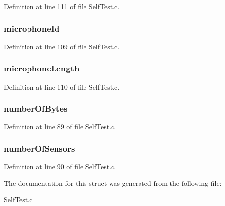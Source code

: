 Definition at line 111 of file Self\-Test.\-c.

\hypertarget{struct_self_test__t_a7345af3b7738b2b5c96c5bfd21179e0d}{
\subsubsection[{microphone\-Id}]{ microphone\-Id}}\label{struct_self_test__t_a7345af3b7738b2b5c96c5bfd21179e0d}


Definition at line 109 of file Self\-Test.\-c.

\hypertarget{struct_self_test__t_a63534aaab709975bb5a4dfd0a930f887}{
\subsubsection[{microphone\-Length}]{ microphone\-Length}}\label{struct_self_test__t_a63534aaab709975bb5a4dfd0a930f887}


Definition at line 110 of file Self\-Test.\-c.

\hypertarget{struct_self_test__t_a85447c46a40fabe0e6eb5497cc76e2fd}{
\subsubsection[{number\-Of\-Bytes}]{ number\-Of\-Bytes}}\label{struct_self_test__t_a85447c46a40fabe0e6eb5497cc76e2fd}


Definition at line 89 of file Self\-Test.\-c.

\hypertarget{struct_self_test__t_aea8fb034bd4664a4d6dc9150a53df40f}{
\subsubsection[{number\-Of\-Sensors}]{ number\-Of\-Sensors}}\label{struct_self_test__t_aea8fb034bd4664a4d6dc9150a53df40f}


Definition at line 90 of file Self\-Test.\-c.



The documentation for this struct was generated from the following file\-:\begin{DoxyCompactItemize}
\item 
Self\-Test.\-c\end{DoxyCompactItemize}
